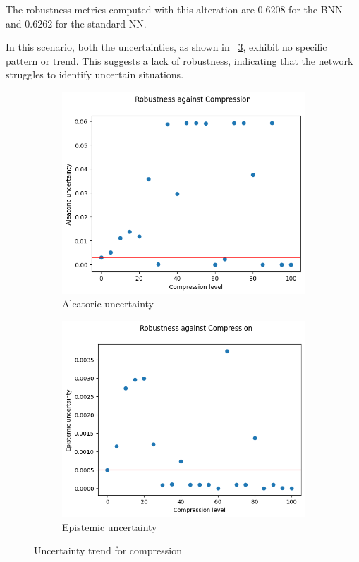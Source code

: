 The robustness metrics computed with this alteration are $0.6208$ for the BNN and $0.6262$ for the standard NN.

In this scenario, both the uncertainties, as shown in \Fig~\ref{fig:co_uncertainty}, exhibit no specific pattern or trend. This suggests a lack of robustness, indicating that the network struggles to identify uncertain situations.
\begin{figure}[h]
	\centering
	\begin{subfigure}{.5\textwidth}
		\centering
		\includegraphics[width=0.9\linewidth]{ImageFiles/EvalBNN/CO/aleatoric}
		\caption{Aleatoric uncertainty}
		\label{fig:co_aleatoric}
	\end{subfigure}%
	\begin{subfigure}{.5\textwidth}
		\centering
		\includegraphics[width=0.9\linewidth]{ImageFiles/EvalBNN/CO/epistemic}
		\caption{Epistemic uncertainty}
		\label{fig:co_epistemic}
	\end{subfigure}
	\caption{Uncertainty trend for compression}
	\label{fig:co_uncertainty}
\end{figure}

